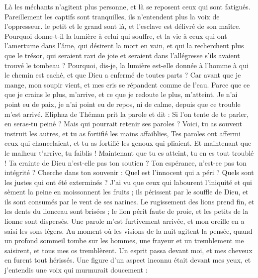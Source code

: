 \begin{multicols}{2}
Là les méchants n'agitent plus personne, et là se reposent ceux qui sont fatigués. 
Pareillement les captifs sont tranquilles, ils n'entendent plus la voix de l'oppresseur. 
le petit et le grand sont là, et l'esclave est délivré de son maître.
Pourquoi donne-t-il la lumière à celui qui souffre, et la vie à ceux qui ont l'amertume dans l'âme,
qui désirent la mort en vain, et qui la recherchent plus que le trésor,
qui seraient ravi de joie et seraient dans l'allégresse s'ils avaient trouvé le tombeau ?
Pourquoi, dis-je, la lumière est-elle donnée à l'homme à qui le chemin est caché, et que Dieu a enfermé de toutes parts ?
Car avant que je mange, mon soupir vient, et mes cris se répandent comme de l'eau. 
Parce que ce que je crains le plus, m'arrive, et ce que je redoute le plus, m'atteint. 
Je n'ai point eu de paix, je n'ai point eu de repos, ni de calme, depuis que ce trouble m'est arrivé. 
\VerseOne{}Eliphaz de Théman prit la parole et dit :
Si l'on tente de te parler, en seras-tu peiné ? Mais qui pourrait retenir ses paroles ?
Voici, tu as souvent instruit les autres, et tu as fortifié les mains affaiblies,
Tes paroles ont affermi ceux qui chancelaient, et tu as fortifié les genoux qui pliaient.
Et maintenant que le malheur t'arrive, tu faiblis ! Maintenant que tu es atteint, tu en es tout troublé !
Ta crainte de Dieu n'est-elle pas ton soutien ? Ton espérance, n'est-ce pas ton intégrité ?
Cherche dans ton souvenir : Quel est l'innocent qui a péri ? Quels sont les justes qui ont été exterminés ?
J'ai vu que ceux qui labourent l'iniquité et qui sèment la peine en moissonnent les fruits ;
ils périssent par le souffle de Dieu, et ils sont consumés par le vent de ses narines.
Le rugissement des lions prend fin, et les dents du lionceau sont brisées ;
le lion périt faute de proie, et les petits de la lionne sont dispersés.
Une parole m'est furtivement arrivée, et mon oreille en a saisi les sons légers.
Au moment où les visions de la nuit agitent la pensée, quand un profond sommeil tombe sur les hommes,
une frayeur et un tremblement me saisirent, et tous mes os tremblèrent.
Un esprit passa devant moi, et mes cheveux en furent tout hérissés. 
Une figure d'un aspect inconnu était devant mes yeux, et j'entendis une voix qui murmurait doucement :

\end{multicols}
